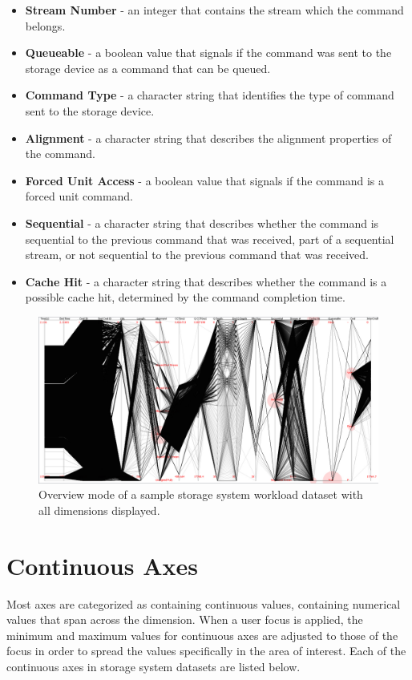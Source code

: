 \documentclass[12pt]{ucthesis}
\begin{document}
\begin{itemize}
\item \textbf{Stream Number} - an integer that contains the stream which the command belongs.

\item \textbf{Queueable} - a boolean value that signals if the command was sent to the storage device as a command that can be queued. 

\item \textbf{Command Type} - a character string that identifies the type of command sent to the storage device.

\item \textbf{Alignment} - a character string that describes the alignment properties of the command.

\item \textbf{Forced Unit Access} - a boolean value that signals if the command is a forced unit command.

\item \textbf{Sequential} - a character string that describes whether the command is sequential to the previous command that was received, part of a sequential stream, or not sequential to the previous command that was received.

\item \textbf{Cache Hit} - a character string that describes whether the command is a possible cache hit, determined by the command completion time.
\end{itemize}

\begin{figure}[h!]
 \centering
 \includegraphics[width=\textwidth]{images/overview.jpg}
 \caption[Overview mode of a sample storage system workload dataset.]{Overview mode of a sample storage system workload dataset with all dimensions displayed.}
 \label{fig:overview}
\end{figure}

\section{Continuous Axes}
Most axes are categorized as containing continuous values, containing numerical values that span across the dimension. When a user focus is applied, the minimum and maximum values for continuous axes are adjusted to those of the focus in order to spread the values specifically in the area of interest. Each of the continuous axes in storage system datasets are listed below.
\end{document}
